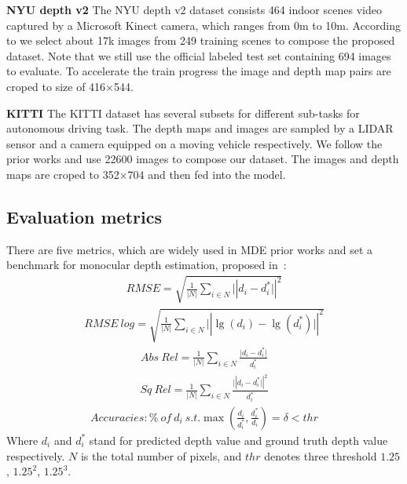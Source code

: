 \documentclass{svjour3}                     %
\begin{document}
\noindent \textbf{NYU depth v2}
The NYU depth v2 dataset consists 464 indoor scenes video captured by a Microsoft
Kinect camera, which ranges from 0m to 10m. According to \cite{eigen2014depth}
we select about 17k images from 249 training scenes to compose the
proposed dataset. Note that we still use the official labeled test set containing
694 images to evaluate.
To accelerate the train progress the 
image and depth map pairs are croped to size 
of 416×544.

\noindent \textbf{KITTI}
The KITTI dataset has several subsets for different sub-tasks for autonomous
driving task. The depth maps and images are sampled by a LIDAR sensor and a camera 
equipped on a moving vehicle respectively. We follow the prior works and use
22600 images to compose our dataset. The images and depth maps 
are croped to 352×704 and then fed into the model.

\subsection{Evaluation metrics}
There are five metrics, which are widely used in MDE prior works and set a benchmark for monocular depth estimation, proposed in~\cite{eigen2014depth}:
\begin{align}
 RMSE=\sqrt{\frac{1}{\lvert N \rvert} \sum\nolimits_{i\in N}\lvert|d_i - d_i^*\rvert|^2} 
\end{align}
\begin{align}
  RMSE \ log = \sqrt{\frac{1}{\lvert N \rvert}\sum\nolimits_{i\in N}\lvert| \lg(d_i) - \lg(d_i^*) \rvert|^2}
\end{align}
\begin{align}
  Abs \ Rel=\frac{1}{\lvert N \rvert}\sum\nolimits_{i \in N}\frac{\lvert d_i - d_i^* \rvert}{d_i^*}
\end{align}
\begin{align}
  Sq \ Rel=\frac{1}{\lvert N \rvert}\sum\nolimits_{i \in N}\frac{\lvert| d_i - d_i^* \rvert|^2}{d_i^*}
\end{align}
\begin{align}
  Accuracies:\% \ of \ d_i \ s.t. \max(\frac{d_i}{d_i^*},\frac{d_i^*}{d_i})=\delta < thr 
\end{align}
Where $d_i$ and $d_i^*$ stand for predicted depth value and ground truth depth value respectively. $N$ is the total number of pixels, and $thr$ denotes three threshold $1.25$, $1.25^2$, $1.25^3$. 
\end{document}
